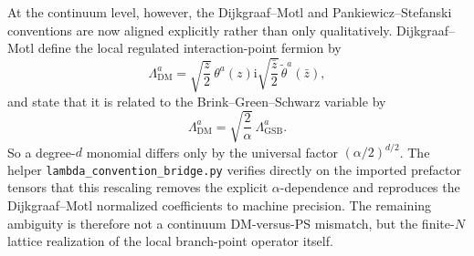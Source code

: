 \documentclass[11pt]{article}
\newcommand{\ii}{\mathrm{i}}
\begin{document}
At the continuum level, however, the Dijkgraaf--Motl and
Pankiewicz--Stefanski conventions are now aligned explicitly rather than only
qualitatively. Dijkgraaf--Motl define the local regulated interaction-point
fermion by
\[
\Lambda^a_{\mathrm{DM}}
=
\sqrt{\frac z2}\,\theta^a(z)
\ii\sqrt{\frac{\bar z}2}\,\tilde\theta^a(\bar z),
\]
and state that it is related to the Brink--Green--Schwarz variable by
\begin{equation}
\Lambda^a_{\mathrm{DM}}
=
\sqrt{\frac{2}{\alpha}}\,
\Lambda^a_{\mathrm{GSB}}.
\label{eq:dm-ps-bridge}
\end{equation}
So a degree-$d$ monomial differs only by the universal factor
$(\alpha/2)^{d/2}$. The helper \texttt{lambda\_convention\_bridge.py} verifies
directly on the imported prefactor tensors that this rescaling removes the
explicit $\alpha$-dependence and reproduces the Dijkgraaf--Motl normalized
coefficients to machine precision. The remaining ambiguity is therefore not a
continuum DM-versus-PS mismatch, but the finite-$N$ lattice realization of the
local branch-point operator itself.
\end{document}
